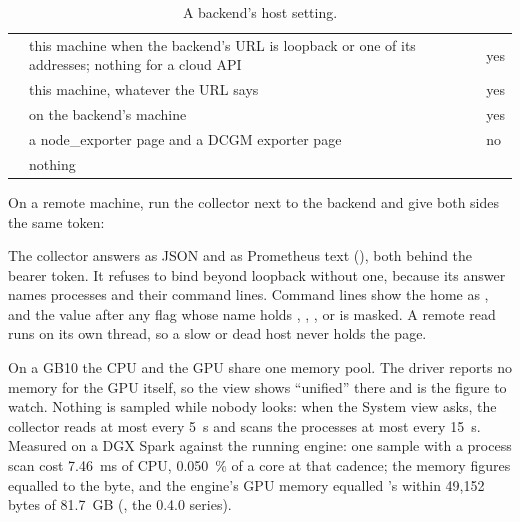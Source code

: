 \begin{table}[htbp]
\centering\small
\caption{A backend's host setting.}\label{tab:host-setting}
\begin{tabularx}{\linewidth}{@{}L{.14\linewidth}YL{.18\linewidth}@{}}
\toprule
{} &  &  \\
\midrule
{} & this machine when the backend's URL is loopback or one of its addresses; nothing for a cloud API & yes \\
 & this machine, whatever the URL says & yes \\
 &  on the backend's machine & yes \\
 & a node\_exporter page and a DCGM exporter page & no \\
 & nothing & \\
\bottomrule
\end{tabularx}
\end{table}

On a remote machine, run the collector next to the backend and give both sides the same token:


The collector answers  as JSON and  as Prometheus text (), both behind the bearer token. It refuses to bind beyond loopback without one, because its answer names processes and their command lines. Command lines show the home as \code{~}, and the value after any flag whose name holds , , ,  or  is masked. A remote read runs on its own thread, so a slow or dead host never holds the page.

On a GB10 the CPU and the GPU share one memory pool. The driver reports no memory for the GPU itself, so the view shows \enquote{unified} there and  is the figure to watch. Nothing is sampled while nobody looks: when the System view asks, the collector reads at most every 5~s and scans the processes at most every 15~s. Measured on a DGX Spark against the running engine: one sample with a process scan cost 7.46~ms of CPU, 0.050~\% of a core at that cadence; the memory figures equalled  to the byte, and the engine's GPU memory equalled 's within 49,152 bytes of 81.7~GB (\measured, the 0.4.0 series).

